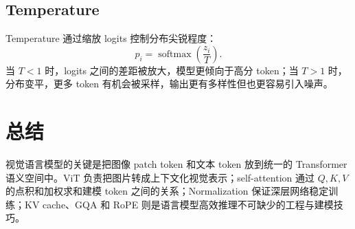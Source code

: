 \documentclass[a4paper,12pt]{article}
\DeclareMathOperator{\softmax}{softmax}
\begin{document}
\subsection{Temperature}

Temperature 通过缩放 logits 控制分布尖锐程度：
\[
    p_i=\softmax\left(\frac{z_i}{T}\right).
\]
当 $T<1$ 时，logits 之间的差距被放大，模型更倾向于高分 token；当 $T>1$ 时，分布变平，更多 token 有机会被采样，输出更有多样性但也更容易引入噪声。

\section{总结}

视觉语言模型的关键是把图像 patch token 和文本 token 放到统一的 Transformer 语义空间中。ViT 负责把图片转成上下文化视觉表示；self-attention 通过 $Q,K,V$ 的点积和加权求和建模 token 之间的关系；Normalization 保证深层网络稳定训练；KV cache、GQA 和 RoPE 则是语言模型高效推理不可缺少的工程与建模技巧。
\end{document}
